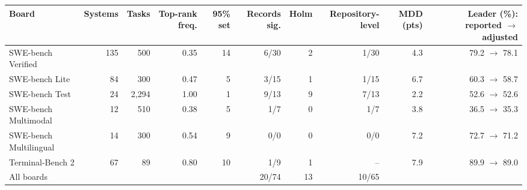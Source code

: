 \begin{tabular}{lrrrrrrrrr}
\toprule
Board & Systems & Tasks & Top-rank freq. & 95\% set & Records sig. & Holm & Repository-level & MDD (pts) & Leader (\%): reported $\to$ adjusted \\
\midrule
SWE-bench Verified & 135 & 500 & 0.35 & 14 & 6/30 & 2 & 1/30 & 4.3 & 79.2 $\to$ 78.1 \\
SWE-bench Lite & 84 & 300 & 0.47 & 5 & 3/15 & 1 & 1/15 & 6.7 & 60.3 $\to$ 58.7 \\
SWE-bench Test & 24 & 2,294 & 1.00 & 1 & 9/13 & 9 & 7/13 & 2.2 & 52.6 $\to$ 52.6 \\
SWE-bench Multimodal & 12 & 510 & 0.38 & 5 & 1/7 & 0 & 1/7 & 3.8 & 36.5 $\to$ 35.3 \\
SWE-bench Multilingual & 14 & 300 & 0.54 & 9 & 0/0 & 0 & 0/0 & 7.2 & 72.7 $\to$ 71.2 \\
Terminal-Bench 2 & 67 & 89 & 0.80 & 10 & 1/9 & 1 & -- & 7.9 & 89.9 $\to$ 89.0 \\
\midrule
All boards & & & & & 20/74 & 13 & 10/65 & & \\
\bottomrule
\end{tabular}
